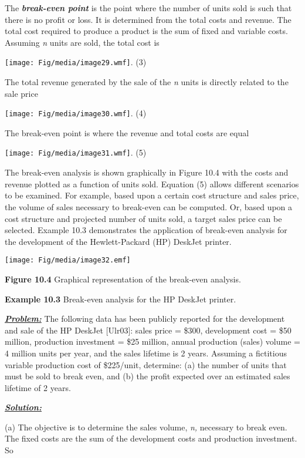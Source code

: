 The \emph{\textbf{break-even point}} is the point where the number of
units sold is such that there is no profit or loss. It is determined
from the total costs and revenue. The total cost required to produce a
product is the sum of fixed and variable costs. Assuming \emph{n} units
are sold, the total cost is

\texttt{[image: Fig/media/image29.wmf]}. (3)

The total revenue generated by the sale of the \emph{n} units is
directly related to the sale price

\texttt{[image: Fig/media/image30.wmf]}. (4)

The break-even point is where the revenue and total costs are equal

\texttt{[image: Fig/media/image31.wmf]}. (5)

The break-even analysis is shown graphically in Figure 10.4 with the
costs and revenue plotted as a function of units sold. Equation (5)
allows different scenarios to be examined. For example, based upon a
certain cost structure and sales price, the volume of sales necessary to
break-even can be computed. Or, based upon a cost structure and
projected number of units sold, a target sales price can be selected.
Example 10.3 demonstrates the application of break-even analysis for the
development of the Hewlett-Packard (HP) DeskJet printer.

\texttt{[image: Fig/media/image32.emf]}

\textbf{Figure 10.4} Graphical representation of the break-even
analysis.

\textbf{Example 10.3} Break-even analysis for the HP DeskJet printer.

\emph{\textbf{\ul{Problem:}}} The following data has been publicly
reported for the development and sale of the HP DeskJet {[}Ulr03{]}:
sales price = \$300, development cost = \$50 million, production
investment = \$25 million, annual production (sales) volume = 4 million
units per year, and the sales lifetime is 2 years. Assuming a fictitious
variable production cost of \$225/unit, determine: (a) the number of
units that must be sold to break even, and (b) the profit expected over
an estimated sales lifetime of 2 years.

\emph{\textbf{\ul{Solution:}}}

(a) The objective is to determine the sales volume, \emph{n,} necessary
to break even. The fixed costs are the sum of the development costs and
production investment. So

